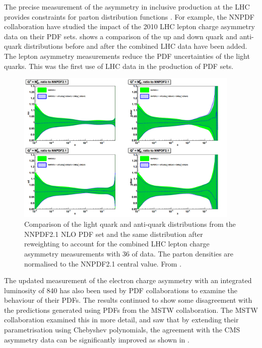 The precise measurement of the asymmetry in inclusive \PW production at the LHC
provides constraints for parton distribution functions \cite{asym840}.  For
example, the NNPDF collaboration \cite{Lionetti:2011pw} have studied the impact
of the 2010 LHC \PW lepton charge asymmetry data on their PDF sets\cite{Ball:2011gg}.
 shows a comparison of the up and down quark and
anti-quark distributions before and after the combined LHC data have been
added\cite{Ball:2011gg}.  The lepton asymmetry measurements reduce the PDF
uncertainties of the light quarks. This was the first use of LHC data in
the production of PDF sets. 

\begin{figure}[htbp]
  \begin{center}
  \includegraphics*[width=0.95\textwidth]{nnpdf_better}
  \caption[Comparison of the light quark and anti-quark distributions from the
NNPDF2.1 NLO PDF set and the same distribution after reweighting to account for
the LHC lepton charge asymmetry measurements with \unit{36}{\invpb} of data.]
{Comparison of the light quark and anti-quark distributions from the NNPDF2.1
NLO PDF set and the same distribution after reweighting to account for the
combined LHC lepton charge asymmetry measurements with \unit{36}{\invpb} of
data.  The parton densities are normalised to the NNPDF2.1 central value.  From
\cite{Ball:2011gg}. } \label{fig:effect}
  \end{center}
\end{figure}

The updated measurement of the electron charge asymmetry with an integrated
luminosity of \unit{840}{\invpb} has also been used by PDF collaborations to
examine the behaviour of their PDFs.  The results continued to show some
disagreement with the predictions generated using PDFs from the MSTW
collaboration.  The MSTW collaboration examined this in more
detail\cite{martin2013extended}, and saw that by extending their parametrisation
using Chebyshev polynomials, the agreement with the CMS asymmetry data can be
significantly improved as shown in .


